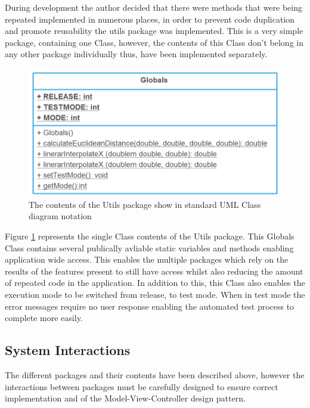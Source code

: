During development the author decided that there were methods that were being repeated implemented in numerous places, in order to prevent code duplication and promote reusability the utils package was implemented. This is a very simple package, containing one Class, however, the contents of this Class don't belong in any other package individually thus, have been implemented separately.

\begin{figure}[H]
\centering
\includegraphics[scale=0.3]{Images/chapter4/gloabls}
\caption{The contents of the Utils package show in standard UML Class diagram notation}
\label{fig:utilsImp}
\end{figure}

Figure \ref{fig:utilsImp} represents the single Class contents of the Utils package. This Globals Class contains several publically avliable static variables and methods enabling application wide access. This enables the multiple packages which rely on the results of the features present to still have access whilst also reducing the amount of repeated code in the application. In addition to this, this Class also enables the execution mode to be switched from release, to test mode. When in test mode the error messages require no user response enabling the automated test process to complete more easily.

\subsection{System Interactions}

The different packages and their contents have been described above, however the interactions between packages must be carefully designed to ensure correct implementation and of the Model-View-Controller design pattern. 


